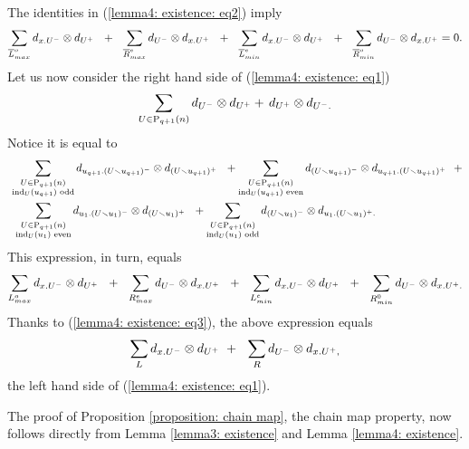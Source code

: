 The identities in (\ref{lemma4: existence: eq2}) imply 
\begin{equation} \label{lemma4: existence: eq3} 
\sum_{\overline{L}_{max}^{o}} d_{x.U^-} \tensor d_{U^+}\ \ +\ \ 
\sum_{\overline{R}_{max}^{e}} d_{U^-} \tensor d_{x.U^+}\ \ +\ \ 
\sum_{\overline{L}_{min}^{e}} d_{x.U^-} \tensor d_{U^+}\ \ +\ \ 
\sum_{\overline{R}_{min}^{o}} d_{U^-} \tensor d_{x.U^+} = 0.
\end{equation}
Let us now consider the right hand side of (\ref{lemma4: existence: eq1})
\begin{equation*}
\sum_{U\in\mathrm{P}_{q+1}(n)} d_{U^-} \otimes d_{U^+} +\, d_{U^+} \otimes d_{U^-.}
\end{equation*}
Notice it is equal to
\begin{align*}
&\, \sum_{\substack{U \in \mathrm{P}_{q+1}(n) \\ \mathrm{ind}_U(u_{q+1}) \text{ odd}}} d_{u_{q+1}.(U \smallsetminus u_{q+1})^-} \otimes d_{(U \smallsetminus u_{q+1})^+}\ \ + 
\sum_{\substack{U \in \mathrm{P}_{q+1}(n) \\ \mathrm{ind}_U(u_{q+1}) \text{ even}}} d_{(U\smallsetminus u_{q+1})^-} \otimes d_{u_{q+1}.(U \smallsetminus u_{q+1})^+}\ \ + \\
&\ \,\sum_{\substack{U \in \mathrm{P}_{q+1}(n) \\ \mathrm{ind}_U(u_1) \text{ even}}} d_{u_1.(U\smallsetminus u_1)^-} \otimes d_{(U\smallsetminus u_1)^+}\ \ +
\sum_{\substack{U \in \mathrm{P}_{q+1}(n) \\ \mathrm{ind}_U(u_1) \text{ odd}}} d_{(U \smallsetminus u_1)^-} \otimes d_{u_1.(U\smallsetminus u_1)^+.}
\end{align*}
This expression, in turn, equals
\begin{equation*} 
\sum_{{L}_{max}^{o}} d_{x.U^-} \tensor d_{U^+}\ \ +\ \ 
\sum_{{R}_{max}^{e}} d_{U^-} \tensor d_{x.U^+}\ \ +\ \ 
\sum_{{L}_{min}^{e}} d_{x.U^-} \tensor d_{U^+}\ \ +\ \ 
\sum_{{R}_{min}^{0}} d_{U^-} \tensor d_{x.U^+.}
\end{equation*}
Thanks to (\ref{lemma4: existence: eq3}), the above expression equals
\begin{equation*}
\sum_{L} d_{x.U^-} \tensor d_{U^+}\ +\ \ 
\sum_{R} d_{U^-} \tensor d_{x.U^+,}
\end{equation*}
the left hand side of (\ref{lemma4: existence: eq1}).

The proof of Proposition \ref{proposition: chain map}, the chain map property, now follows directly from Lemma \ref{lemma3: existence} and Lemma \ref{lemma4: existence}.